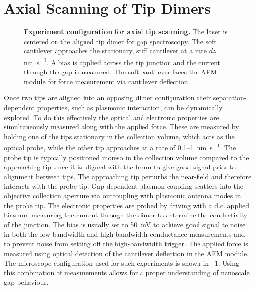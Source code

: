 \documentclass{book}
\begin{document}
\section{Axial Scanning of Tip Dimers}
\label{sec:tip_scanning}

\begin{figure}[h]
\centering
{}
{\caption[Experiment configuration for axial tip scanning]{\textbf{Experiment configuration for axial tip scanning.} The laser is centered on the aligned tip dimer for gap spectroscopy. The soft cantilever approaches the stationary, stiff cantilever at a rate $dz$ \si{\nano\metre\per\second}. A bias is applied across the tip junction and the current through the gap is measured. The soft cantilever faces the AFM module for force measurement via cantilever deflection.}
\label{fig:simple_optics_dimer_layout}}
\end{figure}

Once two tips are aligned into an opposing dimer configuration their separation-dependent properties, such as plasmonic interaction, can be dynamically explored. To do this effectively the optical and electronic properties are simultaneously measured along with the applied force. These are measured by holding one of the tips stationary in the collection volume, which acts as the optical probe, while the other tip approaches at a rate of 0.1--\SI{1}{\nano\metre\per\second}. The probe tip is typically positioned moreso in the collection volume compared to the approaching tip since it is aligned with the beam to give good signal prior to alignment between tips. The approaching tip perturbs the near-field and therefore interacts with the probe tip. Gap-dependent plasmon coupling scatters into the objective collection aperture via outcoupling with plasmonic antenna modes in the probe tip.
The electronic properties are probed by driving with a d.c. applied bias and measuring the current through the dimer to determine the conductivity of the junction. The bias is usually set to \SI{50}{mV} to achieve good signal to noise in both the low-bandwidth and high-bandwidth conductance measurements and to prevent noise from setting off the high-bandwidth trigger.
The applied force is measured using optical detection of the cantilever deflection in the AFM module. The microscope configuration used for such experiments is shown in \figurename~\ref{fig:simple_optics_dimer_layout}. Using this combination of measurements allows for a proper understanding of nanoscale gap behaviour.
\end{document}

